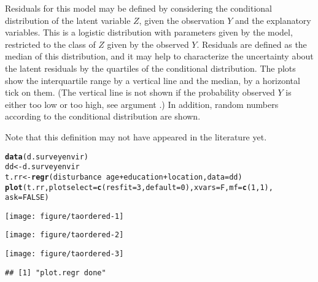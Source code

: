 \documentclass[11pt]{article}\usepackage[]{graphicx}\usepackage[]{color}
\makeatletter
\def\maxwidth{ %
  \ifdim\Gin@nat@width>\linewidth
    \linewidth
  \else
    \Gin@nat@width
  \fi
}
\newcommand{\hlnum}[1]{\textcolor[rgb]{0.686,0.059,0.569}{#1}}%
\newcommand{\hlopt}[1]{\textcolor[rgb]{0,0,0}{#1}}%
\newcommand{\hlstd}[1]{\textcolor[rgb]{0.345,0.345,0.345}{#1}}%
\newcommand{\hlkwb}[1]{\textcolor[rgb]{0.69,0.353,0.396}{#1}}%
\newcommand{\hlkwc}[1]{\textcolor[rgb]{0.333,0.667,0.333}{#1}}%
\newcommand{\hlkwd}[1]{\textcolor[rgb]{0.737,0.353,0.396}{\textbf{#1}}}%
\newenvironment{kframe}{%
 \def\at@end@of@kframe{}%
 \ifinner\ifhmode%
  \def\at@end@of@kframe{\end{minipage}}%
  \begin{minipage}{\columnwidth}%
 \fi\fi%
 \def\FrameCommand##1{\hskip\@totalleftmargin \hskip-\fboxsep
 \colorbox{shadecolor}{##1}\hskip-\fboxsep
     \hskip-\linewidth \hskip-\@totalleftmargin \hskip\columnwidth}%
 \MakeFramed {\advance\hsize-\width
   \@totalleftmargin\z@ \linewidth\hsize
   \@setminipage}}%
 {\par\unskip\endMakeFramed%
 \at@end@of@kframe}
\newenvironment{knitrout}{}{} %
\makeatother
\begin{document}
Residuals for this model may be defined by considering the conditional
distribution of the latent variable $Z$, given the observation $Y$ and the
explanatory variables. This is a logistic distribution with parameters
given by the model, restricted to the class of $Z$ given by the observed
$Y$. Residuals are defined as the median of this distribution, and 
it may help to characterize the uncertainty about the latent residuals by 
the quartiles of the conditional distribution.
The plots show the interquartile range by a vertical line and the median,
by a horizontal tick on them. (The vertical line is not shown if the 
probability observed $Y$ is either too low or too high, see argument
.)
In addition, random numbers according to the conditional distribution are
shown. 

Note that this definition may not have appeared in the literature yet.

\Bfig
\begin{knitrout}
\color{fgcolor}\begin{kframe}
\begin{alltt}
\hlkwd{data}\hlstd{(d.surveyenvir)}
\hlstd{dd} \hlkwb{<-} \hlstd{d.surveyenvir}
\hlstd{t.rr} \hlkwb{<-} \hlkwd{regr}\hlstd{(disturbance}\hlopt{~}\hlstd{age}\hlopt{+}\hlstd{education}\hlopt{+}\hlstd{location,} \hlkwc{data}\hlstd{=dd)}
\hlkwd{plot}\hlstd{(t.rr,} \hlkwc{plotselect}\hlstd{=}\hlkwd{c}\hlstd{(}\hlkwc{resfit}\hlstd{=}\hlnum{3}\hlstd{,} \hlkwc{default}\hlstd{=}\hlnum{0}\hlstd{),} \hlkwc{xvars}\hlstd{=F,} \hlkwc{mf}\hlstd{=}\hlkwd{c}\hlstd{(}\hlnum{1}\hlstd{,}\hlnum{1}\hlstd{),}
     \hlkwc{ask}\hlstd{=}\hlnum{FALSE}\hlstd{)}
\end{alltt}


{\ttfamily\noindent\color{warningcolor}{\#\# Warning in plot.regr(t.rr, plotselect = c(resfit = 3, default = 0), xvars = F, : :plot.regr: Inadequate elements in plotselect: resfit, default}}\end{kframe}
\texttt{[image: figure/taordered-1]} 

\texttt{[image: figure/taordered-2]} 

\texttt{[image: figure/taordered-3]} 
\begin{kframe}\begin{verbatim}
## [1] "plot.regr done"
\end{verbatim}
\end{kframe}
\end{knitrout}
  
\end{document}
